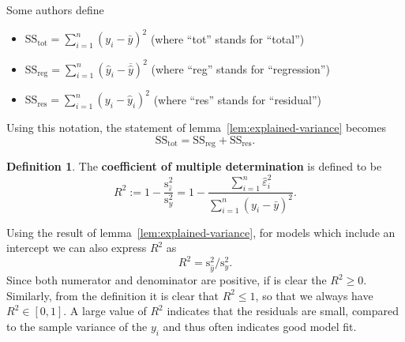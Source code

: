 \documentclass[
  a4paper,
]{article}
\providecommand{\tightlist}{%
  \setlength{\itemsep}{0pt}\setlength{\parskip}{0pt}}
\theoremstyle{definition}
\newtheorem{definition}{Definition}[section]
\theoremstyle{definition}
\theoremstyle{definition}
\theoremstyle{definition}
\theoremstyle{remark}
\begin{document}
Some authors define

\begin{itemize}
\tightlist
\item
  \(\mathrm{SS}_\mathrm{tot} = \sum_{i=1}^n (y_i - \bar y)^2\)
  (where ``tot'' stands for ``total'')
\item
  \(\mathrm{SS}_\mathrm{reg} = \sum_{i=1}^n (\hat y_i - \overline{\hat y})^2\)
  (where ``reg'' stands for ``regression'')
\item
  \(\mathrm{SS}_\mathrm{res} = \sum_{i=1}^n (y_i-\hat y_i)^2\)
  (where ``res'' stands for ``residual'')
\end{itemize}

Using this notation, the statement of lemma~\ref{lem:explained-variance}
becomes
\begin{equation*}
  \mathrm{SS}_\mathrm{tot}
  = \mathrm{SS}_\mathrm{reg} + \mathrm{SS}_\mathrm{res}.
\end{equation*}

\begin{definition}
\protect\hypertarget{def:R-squared}{}\label{def:R-squared}The \textbf{coefficient of multiple determination} is defined to be
\begin{equation*}
  R^2
  := 1 - \frac{\mathrm{s}_{\hat\varepsilon}^2}{\mathrm{s}_y^2}
  = 1 - \frac{\sum_{i=1}^n \hat\varepsilon_i^2}{\sum_{i=1}^n (y_i - \bar y)^2}.
\end{equation*}
\end{definition}

Using the result of lemma~\ref{lem:explained-variance}, for models which
include an intercept we can also
express \(R^2\) as
\begin{equation*}
  R^2
  = \mathrm{s}_{\hat y}^2 / \mathrm{s}_y^2.
\end{equation*}
Since both numerator and denominator are positive, if is clear the \(R^2 \geq 0\). Similarly, from the definition it is clear that \(R^2 \leq 1\), so that we
always have \(R^2 \in [0, 1]\). A large value of \(R^2\) indicates that
the residuals are small, compared to the sample variance of the \(y_i\)
and thus often indicates good model fit.
\end{document}

